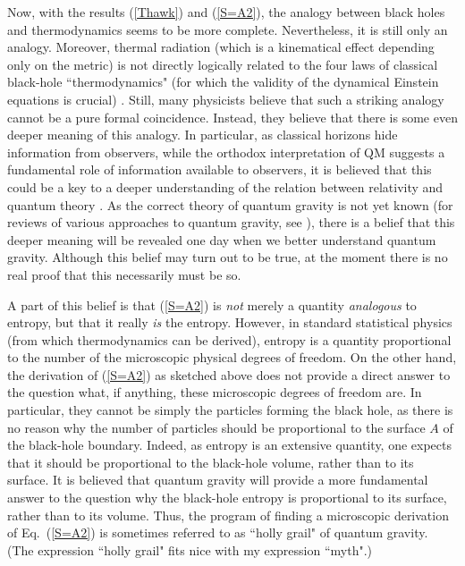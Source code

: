 \documentclass[12pt]{article}
\begin{document}
Now, with the results (\ref{Thawk}) and (\ref{S=A2}), the analogy
between black holes and thermodynamics seems to be more complete.
Nevertheless, it is still only an analogy. Moreover, 
thermal radiation (which is a kinematical effect depending 
only on the metric) is not directly logically related to the four laws 
of classical black-hole ``thermodynamics" (for which the validity
of the dynamical Einstein equations is crucial) \cite{viss}. 
Still, many physicists
believe that such a striking analogy cannot be a pure formal coincidence.
Instead, they believe that there is some even deeper meaning of this 
analogy. In particular, as classical horizons hide information from 
observers, while the orthodox interpretation of QM suggests a 
fundamental role of information available to observers, it is   
believed that this could be a key to a deeper understanding
of the relation between relativity and quantum theory \cite{peres}. 
As the correct theory of quantum gravity is not yet 
known (for reviews of various approaches to quantum gravity, 
see \cite{carl,alvar}), there is a belief that this deeper 
meaning will be revealed one day when we better
understand quantum gravity. Although this belief may turn out 
to be true, at the moment there is no real proof that this 
necessarily must be so.  

A part of this belief is that (\ref{S=A2}) is {\em not} merely
a quantity {\em analogous} to entropy, but that it really {\em is}
the entropy. However, in standard statistical physics (from which 
thermodynamics can be derived), entropy is a quantity 
proportional to the number of the microscopic physical degrees of 
freedom. On the other hand, the derivation of (\ref{S=A2})
as sketched above does not provide a direct answer to the 
question what, if anything, these microscopic degrees of freedom are.
In particular, they cannot be simply the particles forming
the black hole, as there is no reason why the number of particles 
should be proportional to the surface $A$ of the black-hole boundary.
Indeed, as entropy is an extensive quantity, one expects 
that it should be proportional to the black-hole volume, rather 
than to its surface. It is believed that quantum gravity
will provide a more fundamental answer to the question
why the black-hole entropy is proportional to its surface, 
rather than to its volume.
Thus, the program of finding a microscopic derivation
of Eq.~(\ref{S=A2}) is sometimes referred to as  
``holly grail" of quantum gravity. (The expression ``holly grail"
fits nice with my expression ``myth".)    
\end{document}
